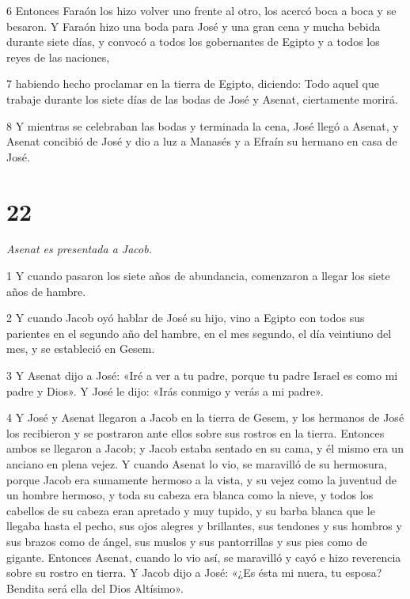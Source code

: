 \par 6 Entonces Faraón los hizo volver uno frente al otro, los acercó boca a boca y se besaron. Y Faraón hizo una boda para José y una gran cena y mucha bebida durante siete días, y convocó a todos los gobernantes de Egipto y a todos los reyes de las naciones,

\par 7 habiendo hecho proclamar en la tierra de Egipto, diciendo: Todo aquel que trabaje durante los siete días de las bodas de José y Asenat, ciertamente morirá.

\par 8 Y mientras se celebraban las bodas y terminada la cena, José llegó a Asenat, y Asenat concibió de José y dio a luz a Manasés y a Efraín su hermano en casa de José.

\chapter{22}

\par \textit{Asenat es presentada a Jacob.}


\par 1 Y cuando pasaron los siete años de abundancia, comenzaron a llegar los siete años de hambre.

\par 2 Y cuando Jacob oyó hablar de José su hijo, vino a Egipto con todos sus parientes en el segundo año del hambre, en el mes segundo, el día veintiuno del mes, y se estableció en Gesem.

\par 3 Y Asenat dijo a José: «Iré a ver a tu padre, porque tu padre Israel es como mi padre y Dios». Y José le dijo: «Irás conmigo y verás a mi padre».

\par 4 Y José y Asenat llegaron a Jacob en la tierra de Gesem, y los hermanos de José los recibieron y se postraron ante ellos sobre sus rostros en la tierra. Entonces ambos se llegaron a Jacob; y Jacob estaba sentado en su cama, y ​​él mismo era un anciano en plena vejez. Y cuando Asenat lo vio, se maravilló de su hermosura, porque Jacob era sumamente hermoso a la vista, y su vejez como la juventud de un hombre hermoso, y toda su cabeza era blanca como la nieve, y todos los cabellos de su cabeza eran apretado y muy tupido, y su barba blanca que le llegaba hasta el pecho, sus ojos alegres y brillantes, sus tendones y sus hombros y sus brazos como de ángel, sus muslos y sus pantorrillas y sus pies como de gigante. Entonces Asenat, cuando lo vio así, se maravilló y cayó e hizo reverencia sobre su rostro en tierra. Y Jacob dijo a José: «¿Es ésta mi nuera, tu esposa? Bendita será ella del Dios Altísimo».

